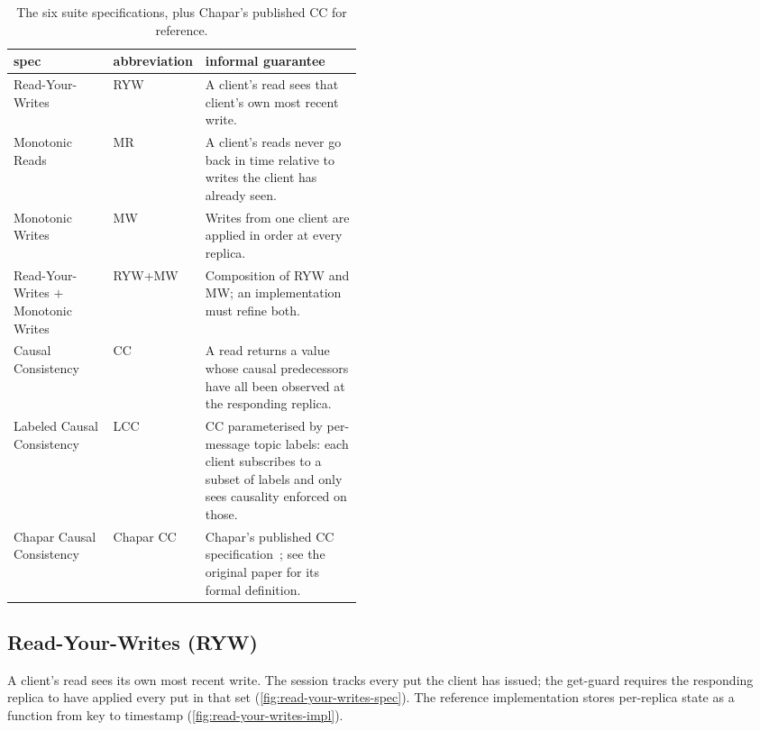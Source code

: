 \begin{table}[h]
\centering
\small
\setlength{\tabcolsep}{6pt}
\renewcommand{\arraystretch}{1.15}
\begin{tabular}{@{}llp{0.45\linewidth}@{}}
\toprule
spec & abbreviation & informal guarantee \\
\midrule
Read-Your-Writes                          & RYW    & A client's read sees that client's own most recent write. \\
Monotonic Reads                           & MR     & A client's reads never go back in time relative to writes the client has already seen. \\
Monotonic Writes                          & MW     & Writes from one client are applied in order at every replica. \\
Read-Your-Writes $+$ Monotonic Writes     & RYW+MW & Composition of RYW and MW; an implementation must refine both. \\
Causal Consistency                        & CC     & A read returns a value whose causal predecessors have all been observed at the responding replica. \\
Labeled Causal Consistency                & LCC    & CC parameterised by per-message topic labels: each client subscribes to a subset of labels and only sees causality enforced on those. \\
Chapar Causal Consistency                 & Chapar CC & Chapar's published CC specification~\cite{chapar}; see the original paper for its formal definition. \\
\bottomrule
\end{tabular}
\caption{The six \sys{} suite specifications, plus Chapar's published CC for reference.}
\label{tab:suite-summary}
\end{table}
\newpage


\subsection{Read-Your-Writes (RYW)}
A client's read sees its own most recent write. The session tracks every put the client has issued; the get-guard requires the responding replica to have applied every put in that set (\cref{fig:read-your-writes-spec}). The reference implementation stores per-replica state as a function from key to timestamp (\cref{fig:read-your-writes-impl}).


